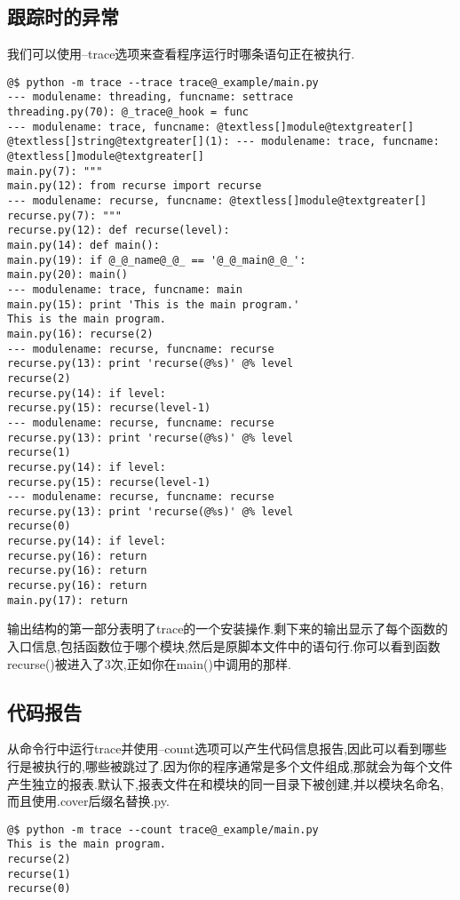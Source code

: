 \documentclass[letterpaper,10pt,english]{manual}
\begin{document}
\subsection{跟踪时的异常}

我们可以使用--trace选项来查看程序运行时哪条语句正在被执行.

\begin{Verbatim}[commandchars=@\[\]]
@$ python -m trace --trace trace@_example/main.py
--- modulename: threading, funcname: settrace
threading.py(70): @_trace@_hook = func
--- modulename: trace, funcname: @textless[]module@textgreater[]
@textless[]string@textgreater[](1): --- modulename: trace, funcname: @textless[]module@textgreater[]
main.py(7): """
main.py(12): from recurse import recurse
--- modulename: recurse, funcname: @textless[]module@textgreater[]
recurse.py(7): """
recurse.py(12): def recurse(level):
main.py(14): def main():
main.py(19): if @_@_name@_@_ == '@_@_main@_@_':
main.py(20): main()
--- modulename: trace, funcname: main
main.py(15): print 'This is the main program.'
This is the main program.
main.py(16): recurse(2)
--- modulename: recurse, funcname: recurse
recurse.py(13): print 'recurse(@%s)' @% level
recurse(2)
recurse.py(14): if level:
recurse.py(15): recurse(level-1)
--- modulename: recurse, funcname: recurse
recurse.py(13): print 'recurse(@%s)' @% level
recurse(1)
recurse.py(14): if level:
recurse.py(15): recurse(level-1)
--- modulename: recurse, funcname: recurse
recurse.py(13): print 'recurse(@%s)' @% level
recurse(0)
recurse.py(14): if level:
recurse.py(16): return
recurse.py(16): return
recurse.py(16): return
main.py(17): return
\end{Verbatim}

输出结构的第一部分表明了trace的一个安装操作.剩下来的输出显示了每个函数的入口信息,包括函数位于哪个模块,然后是原脚本文件中的语句行.你可以看到函数recurse()被进入了3次,正如你在main()中调用的那样.


\subsection{代码报告}

从命令行中运行trace并使用--count选项可以产生代码信息报告,因此可以看到哪些行是被执行的,哪些被跳过了.因为你的程序通常是多个文件组成,那就会为每个文件产生独立的报表.默认下,报表文件在和模块的同一目录下被创建,并以模块名命名,而且使用.cover后缀名替换.py.

\begin{Verbatim}[commandchars=@\[\]]
@$ python -m trace --count trace@_example/main.py
This is the main program.
recurse(2)
recurse(1)
recurse(0)
\end{Verbatim}
\end{document}
